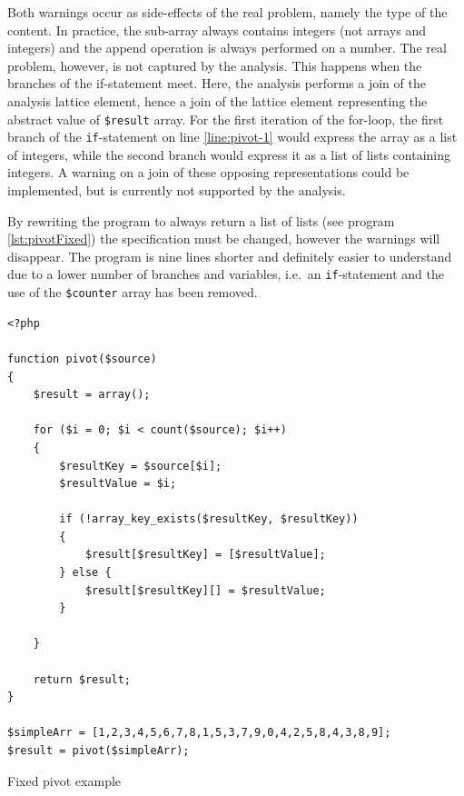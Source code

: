 Both warnings occur as side-effects of the real problem, namely the type of the content. In practice, the sub-array always contains integers (not arrays and integers) and the append operation is always performed on a number. The real problem, however, is not captured by the analysis. This happens when the branches of the if-statement meet. Here, the analysis performs a join of the analysis lattice element, hence a join of the lattice element representing the abstract value of \texttt{\$result} array. For the first iteration of the for-loop, the first branch of the \texttt{if}-statement on line \ref{line:pivot-1} would express the array as a list of integers, while the second branch would express it as a list of lists containing integers. A warning on a join of these opposing representations could be implemented, but is currently not supported by the analysis.

By rewriting the program to always return a list of lists (see program \ref{lst:pivotFixed}) the specification must be changed, however the warnings will disappear. The program is nine lines shorter and definitely easier to understand due to a lower number of branches and variables, i.e.\ an \texttt{if}-statement and the use of the \texttt{\$counter} array has been removed.

\begin{program}
\begin{lstlisting}
<?php

function pivot($source)
{
    $result = array();

    for ($i = 0; $i < count($source); $i++)
    {
        $resultKey = $source[$i];
        $resultValue = $i;

        if (!array_key_exists($resultKey, $resultKey))
        {
            $result[$resultKey] = [$resultValue];
        } else {
            $result[$resultKey][] = $resultValue;
        }

    }

    return $result;
}

$simpleArr = [1,2,3,4,5,6,7,8,1,5,3,7,9,0,4,2,5,8,4,3,8,9];
$result = pivot($simpleArr);
\end{lstlisting}
\caption{Fixed pivot example}
\label{lst:pivotFixed}
\end{program}

